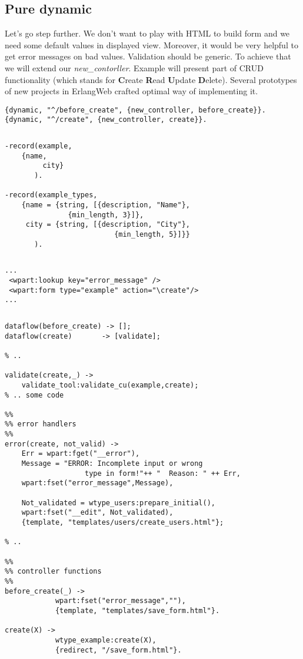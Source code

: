 \subsection{Pure dynamic}
Let's go step further. We don't want to play with HTML to build form and we
need some default values in displayed view. Moreover, it would be very helpful to get
error messages on bad values. Validation should be generic. To achieve that we will extend our
\emph{new\_contorller}. Example will present part of CRUD functionality (which
stands for {\bf C}reate {\bf R}ead {\bf U}pdate {\bf D}elete). Several prototypes of new projects in
ErlangWeb crafted optimal way of implementing it. 

\begin{Verbatim}[frame=single,
       framesep=2mm,
       label=dispacher.conf,labelposition=topline,
       fontsize=\small]
{dynamic, "^/before_create", {new_controller, before_create}}.
{dynamic, "^/create", {new_controller, create}}.
\end{Verbatim}
$ $
\begin{Verbatim}[frame=single,
       framesep=2mm,
       label=example\_records.hrl,labelposition=topline,
       fontsize=\small]
-record(example, 
	{name,
         city}
       ).

-record(example_types, 
	{name = {string, [{description, "Name"},
			   {min_length, 3}]},
	 city = {string, [{description, "City"},
                          {min_length, 5}]}}
       ).
\end{Verbatim}
$ $
\begin{Verbatim}[frame=single,
       framesep=2mm,
       label=save\_form.html,labelposition=topline,fontsize=\small]
...
 <wpart:lookup key="error_message" />
 <wpart:form type="example" action="\create"/> 
...
\end{Verbatim}
$ $
\begin{Verbatim}[frame=single,fontsize=\small,
       framesep=2mm,
       label=new\_controller.erl,labelposition=topline]
dataflow(before_create) -> [];
dataflow(create)       -> [validate];

% ..

validate(create,_) ->
	validate_tool:validate_cu(example,create);
% .. some code

%%
%% error handlers
%%
error(create, not_valid) ->
	Err = wpart:fget("__error"),
 	Message = "ERROR: Incomplete input or wrong 
                   type in form!"++ "  Reason: " ++ Err,
	wpart:fset("error_message",Message),

	Not_validated = wtype_users:prepare_initial(),
	wpart:fset("__edit", Not_validated),
	{template, "templates/users/create_users.html"};

% ..

%%
%% controller functions
%%
before_create(_) ->
            wpart:fset("error_message",""),
            {template, "templates/save_form.html"}.

create(X) -> 
            wtype_example:create(X),
            {redirect, "/save_form.html"}.
\end{Verbatim}

